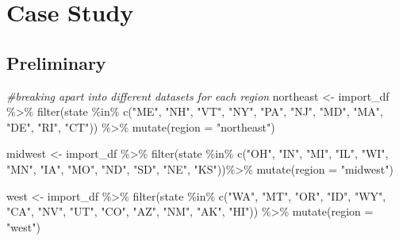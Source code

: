 \documentclass[12pt, twoside]{amherstthesis}
\newenvironment{Shaded}{\begin{snugshade}}{\end{snugshade}}
\newcommand{\AttributeTok}[1]{\textcolor[rgb]{0.77,0.63,0.00}{#1}}
\newcommand{\CommentTok}[1]{\textcolor[rgb]{0.56,0.35,0.01}{\textit{#1}}}
\newcommand{\FunctionTok}[1]{\textcolor[rgb]{0.00,0.00,0.00}{#1}}
\newcommand{\NormalTok}[1]{#1}
\newcommand{\OtherTok}[1]{\textcolor[rgb]{0.56,0.35,0.01}{#1}}
\newcommand{\SpecialCharTok}[1]{\textcolor[rgb]{0.00,0.00,0.00}{#1}}
\newcommand{\StringTok}[1]{\textcolor[rgb]{0.31,0.60,0.02}{#1}}
\begin{document}
\hypertarget{case-study}{%
\section{Case Study}\label{case-study}}

\hypertarget{preliminary}{%
\subsection{Preliminary}\label{preliminary}}
\begin{Shaded}
\begin{Highlighting}[]
\CommentTok{\#breaking apart into different datasets for each region}
\NormalTok{northeast }\OtherTok{\textless{}{-}}\NormalTok{ import\_df }\SpecialCharTok{\%\textgreater{}\%}
  \FunctionTok{filter}\NormalTok{(state }\SpecialCharTok{\%in\%} \FunctionTok{c}\NormalTok{(}\StringTok{"ME"}\NormalTok{, }\StringTok{"NH"}\NormalTok{, }\StringTok{"VT"}\NormalTok{, }\StringTok{"NY"}\NormalTok{, }\StringTok{"PA"}\NormalTok{, }\StringTok{"NJ"}\NormalTok{, }\StringTok{"MD"}\NormalTok{, }
                      \StringTok{"MA"}\NormalTok{, }\StringTok{"DE"}\NormalTok{, }\StringTok{"RI"}\NormalTok{, }\StringTok{"CT"}\NormalTok{)) }\SpecialCharTok{\%\textgreater{}\%}
  \FunctionTok{mutate}\NormalTok{(}\AttributeTok{region =} \StringTok{"northeast"}\NormalTok{)}

\NormalTok{midwest }\OtherTok{\textless{}{-}}\NormalTok{ import\_df }\SpecialCharTok{\%\textgreater{}\%}
  \FunctionTok{filter}\NormalTok{(state }\SpecialCharTok{\%in\%} \FunctionTok{c}\NormalTok{(}\StringTok{"OH"}\NormalTok{, }\StringTok{"IN"}\NormalTok{, }\StringTok{"MI"}\NormalTok{, }\StringTok{"IL"}\NormalTok{, }\StringTok{"WI"}\NormalTok{, }\StringTok{"MN"}\NormalTok{, }\StringTok{"IA"}\NormalTok{, }
                      \StringTok{"MO"}\NormalTok{, }\StringTok{"ND"}\NormalTok{, }\StringTok{"SD"}\NormalTok{, }\StringTok{"NE"}\NormalTok{, }\StringTok{"KS"}\NormalTok{))}\SpecialCharTok{\%\textgreater{}\%}
  \FunctionTok{mutate}\NormalTok{(}\AttributeTok{region =} \StringTok{"midwest"}\NormalTok{)}

\NormalTok{west }\OtherTok{\textless{}{-}}\NormalTok{ import\_df }\SpecialCharTok{\%\textgreater{}\%}
  \FunctionTok{filter}\NormalTok{(state }\SpecialCharTok{\%in\%} \FunctionTok{c}\NormalTok{(}\StringTok{"WA"}\NormalTok{, }\StringTok{"MT"}\NormalTok{, }\StringTok{"OR"}\NormalTok{, }\StringTok{"ID"}\NormalTok{, }\StringTok{"WY"}\NormalTok{, }\StringTok{"CA"}\NormalTok{, }\StringTok{"NV"}\NormalTok{, }
                      \StringTok{"UT"}\NormalTok{, }\StringTok{"CO"}\NormalTok{, }\StringTok{"AZ"}\NormalTok{, }\StringTok{"NM"}\NormalTok{, }\StringTok{"AK"}\NormalTok{, }\StringTok{"HI"}\NormalTok{)) }\SpecialCharTok{\%\textgreater{}\%}
  \FunctionTok{mutate}\NormalTok{(}\AttributeTok{region =} \StringTok{"west"}\NormalTok{)}


\end{Highlighting}
\end{Shaded}
\end{document}
